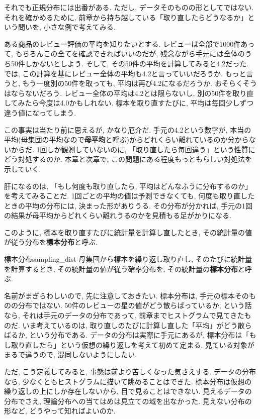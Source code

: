    それでも正規分布には出番がある.
    ただし, データそのものの形としてではない.
    それを確かめるために, 前章から持ち越している「取り直したらどうなるか」という問いを, 小さな例で考えてみる.

    ある商品のレビュー評価の平均を知りたいとする.
    レビューは全部で1000件あって, もちろんこの全てを確認できればいいのだが, 残念ながら手元には全体のうち50件しかないとしよう.
    そして, その50件の平均を計算してみると4.2だった.
    では, この計算を基にレビュー全体の平均も4.2と言っていいだろうか.
    もっと言うと, もう一度別の50件を取っても, 平均は再び4.2になるだろうか.
    おそらくそうはならないだろう.
    レビュー全体の平均は4.2とは限らないし, 別の50件を取り直してみたら今度は4.0かもしれない.
    標本を取り直すたびに, 平均は毎回少しずつ違う値になってしまう.

    この事実は当たり前に思えるが, かなり厄介だ.
    手元の4.2という数字が, 本当の平均(母集団の平均なので\textbf{母平均}と呼ぶ)からどれくらい離れているのか分からないからだ.
    1回しか観測していないのに, 「取り直したら毎回違う」という性質にどう対処するのか.
    本章と次章で, この問題にある程度もっともらしい対処法を示していく.

    肝になるのは, 「もし何度も取り直したら, 平均はどんなふうに分布するのか」を考えてみることだ.
    1回ごとの平均の値は予測できなくても, 何度も取り直したときの平均の分布には, 決まった形がありうる.
    その分布が分かれば, 手元の1回の結果が母平均からどれくらい離れうるのかを見積もる足がかりになる.

    このように, 標本を取り直すたびに統計量を計算し直したとき, その統計量の値が従う分布を\textbf{標本分布}と呼ぶ.

\begin{defi}{標本分布}{sampling_dist}
  母集団から標本を繰り返し取り直し, そのたびに統計量を計算するとき, その統計量の値が従う確率分布を, その統計量の\textbf{標本分布}と呼ぶ.
\end{defi}

    名前がまぎらわしいので, 先に注意しておきたい.
    標本分布は, 手元の標本そのものの分布ではない.
    50件のレビューの星の値がどう散らばっているか, という話なら, それは手元のデータの分布であって, 前章までヒストグラムで見てきたものだ.
    いま考えているのは, 取り直しのたびに計算し直した「平均」がどう散らばるか, という分布である.
    データの分布は実際に手元にあるが, 標本分布は「もし取り直したら」という仮想の繰り返しを考えて初めて定まる.
    見ている対象がまるで違うので, 混同しないようにしたい.

    ただ, こう定義してみると, 事態は前より苦しくなった気さえする.
    データの分布なら, 少なくともヒストグラムに描いて眺めることはできた.
    標本分布は仮想の繰り返しの上にしか存在しないから, 目で見ることはできない.
    見えるデータの分布でさえ, 理論分布への当てはめは見立ての域を出なかった.
    見えない分布の形など, どうやって知ればよいのか.

